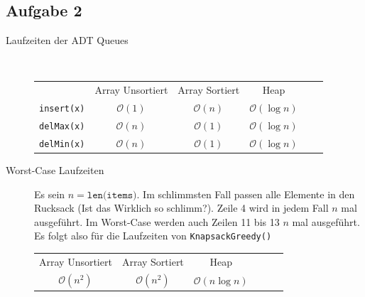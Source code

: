 \documentclass[11pt]{article}
\begin{document}
\subsection*{Aufgabe 2}


\begin{description}
  \item[Laufzeiten der ADT Queues] $ $
    \begin{table}[h!]
      \centering
      \begin{tabular}{c c c c c c}
                             & Array Unsortiert & Array Sortiert   & Heap \\
          \texttt{insert(x)} & $\mathcal{O}(1)$ & $\mathcal{O}(n)$ & $\mathcal{O}(\log n)$ \\
          \texttt{delMax(x)} & $\mathcal{O}(n)$ & $\mathcal{O}(1)$ & $\mathcal{O}(\log n)$ \\
          \texttt{delMin(x)} & $\mathcal{O}(n)$ & $\mathcal{O}(1)$ & $\mathcal{O}(\log n)$ \\
         \end{tabular}
    \end{table}

  \item[Worst-Case Laufzeiten]
    Es sein $n = \texttt{len(items)}$.
    Im schlimmsten Fall passen alle Elemente in den Rucksack 
    (Ist das Wirklich so schlimm?). Zeile 4 wird in jedem Fall $n$ mal
    ausgeführt. Im Worst-Case werden auch Zeilen 11 bis 13 $n$ mal 
    ausgeführt. Es folgt also für die Laufzeiten von \texttt{KnapsackGreedy()}
    \begin{table}[h!]
      \centering
      \begin{tabular}{c c c c c c}
                             Array Unsortiert & Array Sortiert   & Heap \\
          
        $\mathcal{O}(n^2)$ & $\mathcal{O}(n^2)$ & $\mathcal{O}(n \log n)$ \\
      \end{tabular}
    \end{table}
    

  
\end{description}
\newpage
\end{document}
